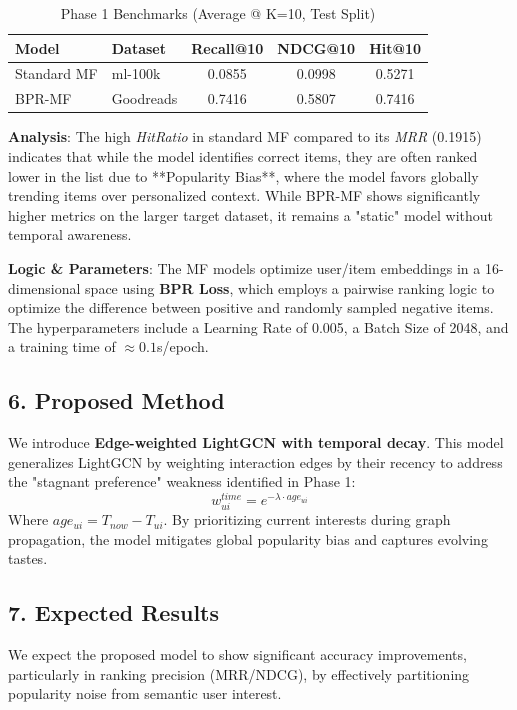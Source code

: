 \documentclass[conference]{IEEEtran}
\begin{document}
\begin{table}[!t]
    \centering
    \caption{Phase 1 Benchmarks (Average @ K=10, Test Split)}
    \label{tab:comparison_results}
    \begin{tabular}{llccc}
        \toprule
        \textbf{Model} & \textbf{Dataset} & \textbf{Recall@10} & \textbf{NDCG@10} & \textbf{Hit@10} \\
        \midrule
        Standard MF & ml-100k & 0.0855 & 0.0998 & 0.5271 \\
        BPR-MF & Goodreads & 0.7416 & 0.5807 & 0.7416 \\
        \bottomrule
    \end{tabular}
\end{table}

\textbf{Analysis}: The high \textit{HitRatio} in standard MF compared to its \textit{MRR} (0.1915) indicates that while the model identifies correct items, they are often ranked lower in the list due to **Popularity Bias**, where the model favors globally trending items over personalized context. While BPR-MF shows significantly higher metrics on the larger target dataset, it remains a "static" model without temporal awareness.

\textbf{Logic \& Parameters}: The MF models optimize user/item embeddings in a 16-dimensional space using \textbf{BPR Loss}, which employs a pairwise ranking logic to optimize the difference between positive and randomly sampled negative items. The hyperparameters include a Learning Rate of 0.005, a Batch Size of 2048, and a training time of $\approx 0.1$s/epoch.

\subsection*{6. Proposed Method}
We introduce \textbf{Edge-weighted LightGCN with temporal decay}. This model generalizes LightGCN by weighting interaction edges by their recency to address the "stagnant preference" weakness identified in Phase 1:
\begin{equation}
    w_{ui}^{time} = e^{-\lambda \cdot age_{ui}}
\end{equation}
Where $age_{ui} = T_{now} - T_{ui}$. By prioritizing current interests during graph propagation, the model mitigates global popularity bias and captures evolving tastes.

\subsection*{7. Expected Results}
We expect the proposed model to show significant accuracy improvements, particularly in ranking precision (MRR/NDCG), by effectively partitioning popularity noise from semantic user interest.
\end{document}
